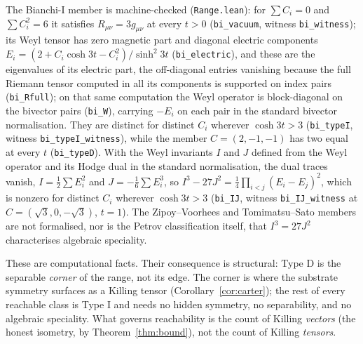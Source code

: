 \documentclass[11pt,a4paper]{article}
\theoremstyle{definition}
\begin{document}
\noindent The Bianchi-I member is machine-checked (\texttt{Range.lean}): for $\sum C_{i}=0$ and $\sum C_{i}^{2}=6$ it satisfies $R_{\mu\nu}=3g_{\mu\nu}$ at every $t>0$ (\texttt{bi\_vacuum}, witness \texttt{bi\_witness}); its Weyl tensor has zero magnetic part and diagonal electric components $E_{i}=(2+C_{i}\cosh3t-C_{i}^{2})/\sinh^{2}3t$ (\texttt{bi\_electric}), and these are the eigenvalues of its electric part, the off-diagonal entries vanishing because the full Riemann tensor computed in all its components is supported on index pairs (\texttt{bi\_Rfull}); on that same computation the Weyl operator is block-diagonal on the bivector pairs (\texttt{bi\_W}), carrying $-E_{i}$ on each pair in the standard bivector normalisation. They are distinct for distinct $C_{i}$ wherever $\cosh3t>3$ (\texttt{bi\_typeI}, witness \texttt{bi\_typeI\_witness}), while the member $C=(2,-1,-1)$ has two equal at every $t$ (\texttt{bi\_typeD}). With the Weyl invariants $I$ and $J$ defined from the Weyl operator and its Hodge dual in the standard normalisation, the dual traces vanish, $I=\tfrac12\sum E_{i}^{2}$ and $J=-\tfrac16\sum E_{i}^{3}$, so $I^{3}-27J^{2}=\tfrac14\prod_{i<j}(E_{i}-E_{j})^{2}$, which is nonzero for distinct $C_{i}$ wherever $\cosh3t>3$ (\texttt{bi\_IJ}, witness \texttt{bi\_IJ\_witness} at $C=(\sqrt3,0,-\sqrt3)$, $t=1$). The Zipoy--Voorhees and Tomimatsu--Sato members are not formalised, nor is the Petrov classification itself, that $I^{3}=27J^{2}$ characterises algebraic speciality.

These are computational facts. Their consequence is structural: Type D is the separable \emph{corner} of the range, not its edge. The corner is where the substrate symmetry surfaces as a Killing tensor (Corollary~\ref{cor:carter}); the rest of every reachable class is Type I and needs no hidden symmetry, no separability, and no algebraic speciality. What governs reachability is the count of Killing \emph{vectors} (the honest isometry, by Theorem~\ref{thm:bound}), not the count of Killing \emph{tensors}.
\end{document}
